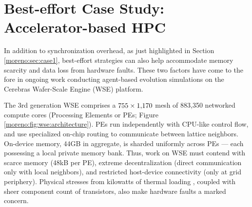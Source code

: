 \section{Best-effort Case Study: Accelerator-based HPC} \label{moreno:sec:case2}



In addition to synchronization overhead, as just highlighted in Section \ref{moreno:sec:case1}, best-effort strategies can also help accommodate memory scarcity and data loss from hardware faults.
These two factors have come to the fore in ongoing work conducting agent-based evolution simulations on the Cerebras Wafer-Scale Engine (WSE) platform.

The 3rd generation WSE comprises a $755 \times 1{\small,}170$ mesh of 883{\small,}350 networked compute cores (Processing Elements or PEs; Figure \ref{moreno:fig:wse:architecture}).
PEs run independently with CPU-like control flow, and use specialized on-chip routing to communicate between lattice neighbors. %
On-device memory, 44GB in aggregate, is sharded uniformly across PEs --- each possessing a local private memory bank.
Thus, work on WSE must contend with scarce memory (48kB per PE), extreme decentralization (direct communication only with local neighbors), and restricted host-device connectivity (only at grid periphery).
Physical stresses from kilowatts of thermal loading \cite{la2020cerebras}, coupled with sheer component count of transistors, also make hardware faults a marked concern.

